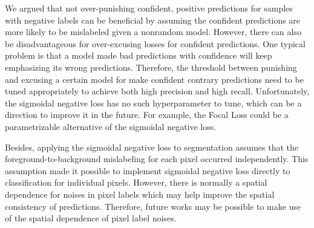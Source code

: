 We argued that not over-punishing confident, positive predictions for samples with negative labels can be beneficial by assuming the confident predictions are more likely to be mislabeled given a nonrandom model.
However, there can also be disadvantageous for over-excusing losses for confident predictions.
One typical problem is that a model made bad predictions with confidence will keep emphasizing its wrong predictions.
Therefore, the threshold between punishing and excusing a certain model for make confident contrary predictions need to be tuned appropriately to achieve both high precision and high recall.
Unfortunately, the sigmoidal negative loss has no such hyperparameter to tune, which can be a direction to improve it in the future.
For example, the Focal Loss\cite{lin2017focal} could be a parametrizable alternative of the sigmoidal negative loss.

Besides, applying the sigmoidal negative loss to segmentation assumes that the foreground-to-background mislabeling for each pixel occurred independently.
This assumption made it possible to implement sigmoidal negative loss directly to classification for individual pixels.
However, there is normally a spatial dependence for noises in pixel labels which may help improve the spatial consistency of predictions.
Therefore, future works may be possible to make use of the spatial dependence of pixel label noises.

%




